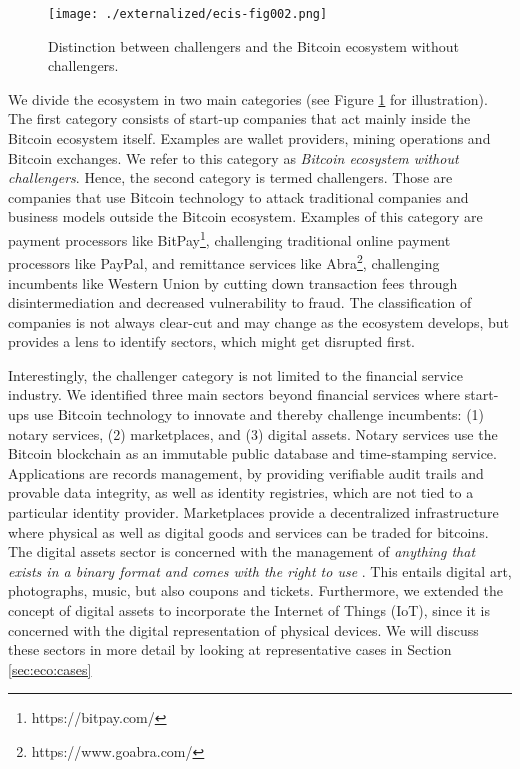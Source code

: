 \begin{figure}[htbp]
\centering
\texttt{[image: ./externalized/ecis-fig002.png]}
\caption{Distinction between challengers and the Bitcoin ecosystem without 
challengers.}
\label{fig:challengers}
\end{figure}

We divide the ecosystem in two main categories (see Figure \ref{fig:challengers} for illustration). 
The first category consists of start-up companies that act mainly inside the Bitcoin 
ecosystem itself. Examples are wallet providers, mining operations and Bitcoin 
exchanges. We refer to this category as \emph{Bitcoin ecosystem without challengers}. 
Hence, the second category is termed challengers. Those are companies that use 
Bitcoin technology to attack traditional companies and business models outside 
the Bitcoin ecosystem. Examples of this category are payment processors like BitPay\footnote{https://bitpay.com/}, challenging traditional online payment processors like PayPal, and remittance 
services like Abra\footnote{https://www.goabra.com/}, challenging incumbents like Western Union by cutting 
down transaction fees through disintermediation and decreased vulnerability to 
fraud. The classification of companies is not always clear-cut and may change as 
the ecosystem develops, but provides a lens to identify sectors, which might get 
disrupted first.

Interestingly, the challenger category is not limited to the financial service 
industry. We identified three main sectors beyond financial services where start-ups 
use Bitcoin technology to innovate and thereby challenge incumbents: (1) notary 
services, (2) marketplaces, and (3) digital assets. Notary services use the Bitcoin 
blockchain as an immutable public database and time-stamping service. Applications 
are records management, by providing verifiable audit trails and provable data 
integrity, as well as identity registries, which are not tied to a particular identity 
provider. Marketplaces provide a decentralized infrastructure where physical as 
well as digital goods and services can be traded for bitcoins. The digital assets 
sector is concerned with the management of \emph{anything that exists in a binary format 
and comes with the right to use} \parencite{wikipedia2016da}. This entails digital art, 
photographs, music, but also coupons and tickets. Furthermore, we extended the 
concept of digital assets to incorporate the Internet of Things (IoT), since it 
is concerned with the digital representation of physical devices. We will discuss 
these sectors in more detail by looking at representative cases in Section \ref{sec:eco:cases}

